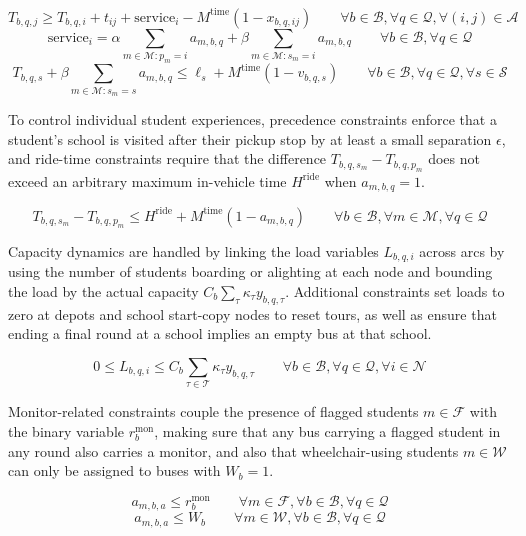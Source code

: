 \[
T_{b,q,j} \geq T_{b,q,i} + t_{ij}
+ \mathrm{service}_i
- M^{\mathrm{time}}\left(1-x_{b,q,ij}\right) \qquad \forall b\in\mathcal{B},\forall q\in\mathcal{Q},\forall \left(i,j\right)\in\mathcal{A}
\]
\[
\mathrm{service}_i=\alpha \sum_{m\in\mathcal{M}:p_m=i} a_{m,b,q}
+ \beta \sum_{m\in\mathcal{M}:s_m=i} a_{m,b,q} \qquad \forall b\in\mathcal{B},\forall q\in\mathcal{Q}
\]
\[
T_{b,q,s} + \beta\sum_{m\in\mathcal{M}:s_m=s} a_{m,b,q} \leq \ell_s + M^{\mathrm{time}}\left(1-v_{b,q,s}\right) \qquad \forall b\in\mathcal{B},\forall q\in\mathcal{Q},\forall s\in\mathcal{S}
\]

To control individual student experiences, precedence constraints enforce that a student’s school is visited after their pickup stop by at least a small separation $\epsilon$, and ride-time constraints require that the difference $T_{b,q,s_m}-T_{b,q,p_m}$ does not exceed an arbitrary maximum in-vehicle time $H^{\mathrm{ride}}$ when $a_{m,b,q}=1$.

\[
T_{b,q,s_m} - T_{b,q,p_m}
\leq H^{\mathrm{ride}} + M^{\mathrm{time}}\left(1-a_{m,b,q}\right) \qquad \forall b\in\mathcal{B},\forall m\in\mathcal{M},\forall q\in\mathcal{Q}
\]

Capacity dynamics are handled by linking the load variables $L_{b,q,i}$ across arcs by using the number of students boarding or alighting at each node and bounding the load by the actual capacity $C_b\sum_{\tau}\kappa_\tau y_{b,q,\tau}$. Additional constraints set loads to zero at depots and school start-copy nodes to reset tours, as well as ensure that ending a final round at a school implies an empty bus at that school. 

\[
0 \leq L_{b,q,i} \leq C_b \sum_{\tau\in\mathcal{T}} \kappa_{\tau} y_{b,q,\tau} \qquad \forall b\in\mathcal{B},\forall q\in\mathcal{Q},\forall i\in\mathcal{N}
\]

Monitor-related constraints couple the presence of flagged students $m\in\mathcal{F}$ with the binary variable $r_b^{\mathrm{mon}}$, making sure that any bus carrying a flagged student in any round also carries a monitor, and also that wheelchair-using students $m\in\mathcal{W}$ can only be assigned to buses with $W_b=1$.

\[
a_{m,b,a} \leq r_b^{\mathrm{mon}} \qquad \forall m\in\mathcal{F},\forall b\in\mathcal{B},\forall q\in\mathcal{Q}
\]
\[
a_{m,b,a} \leq W_b \qquad \forall m\in\mathcal{W},\forall b\in\mathcal{B},\forall q\in\mathcal{Q}
\]

